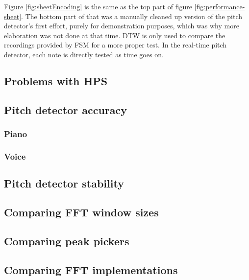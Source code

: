 Figure \ref{fig:sheetEncoding} is the same as the top part of figure \ref{fig:performance-sheet}. The bottom part of that was a manually cleaned up version of the pitch detector's first effort, purely for demonstration purposes, which was why more elaboration was not done at that time. DTW is only used to compare the recordings provided by FSM for a more proper test. In the real-time pitch detector, each note is directly tested as time goes on.

\subsection{Problems with HPS}

\subsection{Pitch detector accuracy}
\subsubsection{Piano}
\subsubsection{Voice}
\subsection{Pitch detector stability}
\subsection{Comparing FFT window sizes}
\subsection{Comparing peak pickers}
\subsection{Comparing FFT implementations}